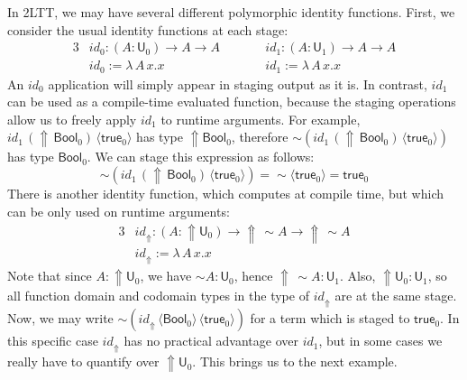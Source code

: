 \documentclass[acmsmall]{acmart}
\newcommand{\mit}[1]{\mathit{#1}}
\newcommand{\msf}[1]{\mathsf{#1}}
\newcommand{\Lift}{{\Uparrow}}
\newcommand{\spl}{{\sim}}
\newcommand{\qut}[1]{\langle #1\rangle}
\renewcommand{\U}{\msf{U}}
\newcommand{\Bool}{\msf{Bool}}
\newcommand{\true}{\msf{true}}
\theoremstyle{remark}
\begin{document}
In 2LTT, we may have several different polymorphic identity functions. First, we
consider the usual identity functions at each stage:
\begin{alignat*}{3}
  & \mit{id}_0 : (A : \U_0) \to A \to A\hspace{2em} && \mit{id}_1 : (A : \U_1) \to A \to A\\
  & \mit{id}_0 := \lambda\,A\,x.x       && \mit{id}_1 := \lambda\,A\,x.x
\end{alignat*}
An $\mit{id}_0$ application will simply appear in staging output as it is. In
contrast, $\mit{id}_1$ can be used as a compile-time evaluated function, because
the staging operations allow us to freely apply $\mit{id}_1$ to runtime
arguments. For example, $\mit{id}_1\,(\Lift\,\Bool_0)\,\qut{\true_0}$ has type
$\Lift \Bool_0$, therefore $\spl(\mit{id}_1\,(\Lift\,\Bool_0)\,\qut{\true_0})$
has type $\Bool_0$. We can stage this expression as follows:
\[
\spl(\mit{id}_1\,(\Lift\,\Bool_0)\,\qut{\true_0}) = \spl\qut{\true_0} = \true_0
\]
There is another identity function, which computes at compile time, but which
can be only used on runtime arguments:
\begin{alignat*}{3}
  & \mit{id_\Lift} : (A : \Lift\U_0) \to \Lift\,\spl A \to \Lift\,\spl A\\
  & \mit{id_\Lift} := \lambda\,A\,x.x
\end{alignat*}
Note that since $A : \Lift\U_0$, we have $\spl A : \U_0$, hence $\Lift\,\spl A
: \U_1$.  Also, $\Lift\U_0 : \U_1$, so all function domain and codomain types in
the type of $\mit{id_\Lift}$ are at the same stage. Now, we may write
$\spl(\mit{id_\Lift}\,\qut{\Bool_0}\,\qut{\true_0})$ for a term which is staged
to $\true_0$. In this specific case $\mit{id_\Lift}$ has no practical advantage
over $\mit{id}_1$, but in some cases we really have to quantify over
$\Lift\U_0$. This brings us to the next example.
\end{document}
